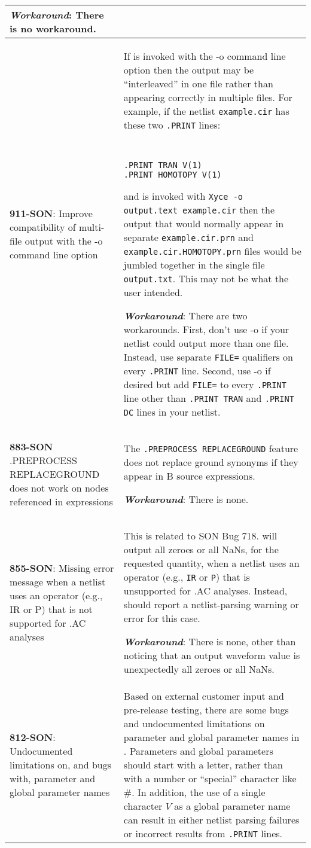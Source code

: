 {\begin{longtable}[h] {>{\raggedright\small}m{2in}|>{\raggedright\let\\\tabularnewline\small}m{3.5in}}
\textbf{\textit{Workaround}}: There is no workaround. \\ \hline

\textbf{911-SON}:  Improve compatibility of multi-file output with the -o command
line option & If \Xyce{} is invoked with the -o command line option then
the output may be ``interleaved'' in one file rather than appearing correctly
in multiple files.  For example, if the netlist \texttt{example.cir} has these
two \texttt{.PRINT} lines:
{\tt
\begin{verbatim}
.PRINT TRAN V(1)
.PRINT HOMOTOPY V(1) 
\end{verbatim}
}
and is invoked with \texttt{Xyce -o output.text example.cir} then the output that
would normally appear in separate \texttt{example.cir.prn} and
\texttt{example.cir.HOMOTOPY.prn} files would be jumbled together in the single
file \texttt{output.txt}.  This may not be what the user intended.

\textbf{\textit{Workaround}}: There are two workarounds.  First, don't use -o if 
your netlist could output more than one file.  Instead, use separate \texttt{FILE=} 
qualifiers on every \texttt{.PRINT} line.  Second, use -o if desired but add 
\texttt{FILE=} to every \texttt{.PRINT} line other than \texttt{.PRINT TRAN} and 
\texttt{.PRINT DC} lines in your netlist.\\ \hline

\textbf{883-SON} .PREPROCESS REPLACEGROUND does not work on nodes referenced 
in expressions &  The \texttt{.PREPROCESS REPLACEGROUND} feature does not 
replace ground synonyms if they appear in B source expressions.
  
\textbf{\textit{Workaround}}: There is none.\\ \hline

\textbf{855-SON}: Missing error message when a netlist uses an operator (e.g., IR or P) that 
is not supported for .AC analyses & This is related to SON Bug
718.  \Xyce{} will output all zeroes or all NaNs, for the requested
quantity, when a netlist uses an operator (e.g.,
\texttt{IR} or \texttt{P}) that is unsupported for .AC analyses.  Instead, \Xyce{} 
should report a netlist-parsing warning or error for this case.

\textbf{\textit{Workaround}}: There is none, other than noticing that an output waveform 
value is unexpectedly all zeroes or all NaNs. \\ \hline

\textbf{812-SON}: Undocumented limitations on, and bugs with, parameter and global 
parameter names & Based on external customer input and pre-release testing, there are
some bugs and undocumented limitations on parameter and global parameter names in 
\Xyce{}. Parameters and global parameters should start with a letter, rather than with a
number or ``special'' character like \#.  In addition, the use of a single 
character $V$ as a global parameter name can result in either netlist parsing failures
or incorrect results from \texttt{.PRINT} lines.  \\ \hline


\end{longtable}}
